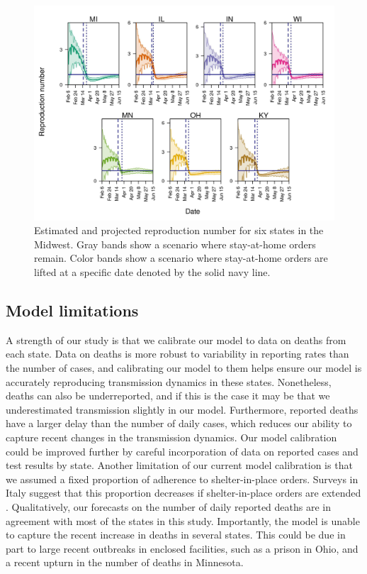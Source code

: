 \documentclass[11pt]{article}
\begin{document}
\begin{figure}[hb!]
\centering
\includegraphics[width=\textwidth]{../figures/report_figure_reproduction_number.jpeg} 
\caption{\label{fig_reproduction_number} Estimated and projected reproduction number for six states in the Midwest. Gray bands show a scenario where stay-at-home orders remain. Color bands show a scenario where stay-at-home orders are lifted at a specific date denoted by the solid navy line.}
\end{figure}




\subsection{Model limitations}

A strength of our study is that we calibrate our model to data on deaths from each state. Data on deaths is more robust to variability in reporting rates than the number of cases, and calibrating our model to them helps ensure our model is accurately reproducing transmission dynamics in these states. Nonetheless, deaths can also be underreported, and if this is the case it may be that we underestimated transmission slightly in our model. Furthermore, reported deaths have a larger delay than the number of daily cases, which reduces our ability to capture recent changes in the transmission dynamics. Our model calibration could be improved further by careful incorporation of data on reported cases and test results by state. Another limitation of our current model calibration is that we assumed a fixed proportion of adherence to shelter-in-place orders. Surveys in Italy suggest that this proportion decreases if  shelter-in-place orders are extended \cite{Briscese2020_NBER}. Qualitatively, our forecasts on the number of daily reported deaths are in agreement with most of the states in this study. Importantly, the model is unable to capture the recent increase in deaths in several states. This could be due in part to large recent outbreaks in enclosed facilities, such as a prison in Ohio, and a recent upturn in the number of deaths in Minnesota. 
\end{document}
